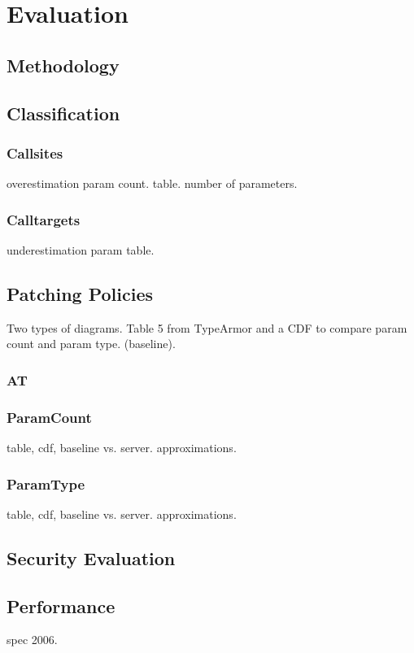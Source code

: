 \chapter{Evaluation}
\label{chapter:Evaluation}

\section{Methodology}


\section{Classification}
\subsection{Callsites}
overestimation param count. table.
number of parameters.

\subsection{Calltargets}
underestimation param table.

\section{Patching Policies}
Two types of diagrams. Table 5 from TypeArmor and a CDF to compare param count and param type. (baseline).
\subsection{AT}
\subsection{ParamCount}
table, cdf, baseline vs. server. approximations.

\subsection{ParamType}
table, cdf, baseline vs. server. approximations.

\section{Security Evaluation}

\section{Performance}
spec 2006.